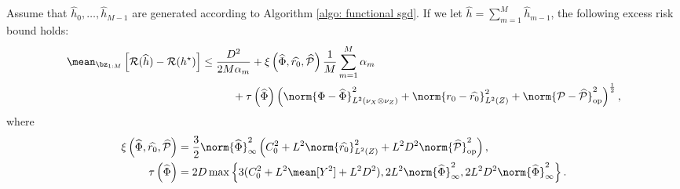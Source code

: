 \begin{theorem}
    Assume that $ \hat{ h }_{ 0 }, \dots, \hat{ h }_{ M-1 } $ are generated according to Algorithm \ref{algo: functional sgd}.
    If we let $ \hat{ h } = \sum_{ m=1 }^{ M } \hat{ h }_{ m-1 } $, the following excess risk bound holds:
    \begin{align*}
        \begin{split}
            \mean_{ \bz_{ 1:M } } \left[
                \risk ( \hat{ h } ) - \risk ( \hstar )
            \right]
            &\leq \frac{ D^2 }{ 2 M \alpha_{ m } }
            + \xi \left( \hat{ \Phi }, \hat{ r_{ 0 } }, \hat{ \meanop } \right) \frac{ 1 }{ M } \sum_{ m=1 }^{ M } \alpha_{ m } \\
            &\hspace{1cm}
            + \tau \left( \hat{ \Phi } \right) \left(
                \norm{ \Phi - \hat{ \Phi } }_{ L^{ 2 } ( \nu_{ X } \otimes \nu_{ Z } ) }^2 + \norm{ r_{ 0 } - \hat{ r_{ 0 } } }_{ L^2 ( Z ) }^2 + \norm{ \meanop - \hat{ \meanop } }_{ \op }^2
            \right)^{ \frac{ 1 }{ 2 } },
        \end{split}
    \end{align*}
    where
    \begin{align*}
        \xi \left( \hat{ \Phi }, \hat{ r_{ 0 } }, \hat{ \meanop } \right)
        &= \frac{ 3 }{ 2 } \norm{ \hat{ \Phi } }_{ \infty }^2 \left(
            C_{ 0 }^2 + L^2 \norm{ \hat{ r_{ 0 } } }_{ L^2 ( Z ) }^2 + L^2 D ^2 \norm{ \hat{ \meanop } }_{ \op }^2
        \right), \\
        \tau \left( \hat{ \Phi } \right)
        &= 2 D \max \left\{
            3 ( C_{ 0 }^2 + L^2 \mean [ Y^2 ] + L^2 D^2 ),
            2L^2 \norm{ \hat{ \Phi } }_{ \infty }^2,
            2L^2 D^2 \norm{ \hat{ \Phi } }_{ \infty }^2
        \right\}
    .\end{align*}
\end{theorem}
